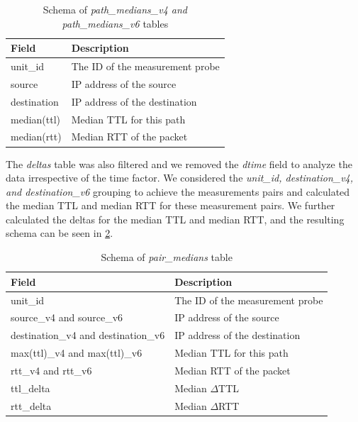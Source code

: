 \begin{table}[!h]
	\centering
	\caption{Schema of \textit{path\_medians\_v4 and path\_medians\_v6} tables}
	\label{table:pathv4v6}
	\begin{tabular}{lp{7cm}}
  		\toprule
  		\textbf{Field} & \textbf{Description} \\ 
  		\midrule
  		unit\_id & The ID of the measurement probe \\ 
		source &  IP address of the source \\ 
		destination & IP address of the destination \\   
		median(ttl) & Median TTL for this path \\ 
		median(rtt) & Median RTT of the packet \\
  		\bottomrule
\end{tabular}
\end{table}

\FloatBarrier

The \textit{deltas} table was also filtered and we removed the \textit{dtime} field to analyze the data irrespective of the time factor. We considered the \textit{unit\_id, destination\_v4, and destination\_v6} grouping to achieve the measurements pairs and calculated the median TTL and median RTT for these measurement pairs. We further calculated the deltas for the median TTL and median RTT, and the resulting schema can be seen in \cref{table:pair}.  

\begin{table}[!h]
	\centering
	\caption{Schema of \textit{pair\_medians} table}
	\label{table:pair}
	\begin{tabular}{lp{7cm}}
  		\toprule
  		\textbf{Field} & \textbf{Description} \\ 
  		\midrule
  		unit\_id & The ID of the measurement probe \\ 
		source\_v4 and source\_v6 &  IP address of the source \\ 
		destination\_v4 and destination\_v6 & IP address of the destination \\   
		max(ttl)\_v4 and max(ttl)\_v6 & Median TTL for this path \\ 
		rtt\_v4 and rtt\_v6 & Median RTT of the packet \\
		ttl\_delta & Median $\Delta$TTL \\
		rtt\_delta & Median $\Delta$RTT \\
  		\bottomrule
\end{tabular}
\end{table}

